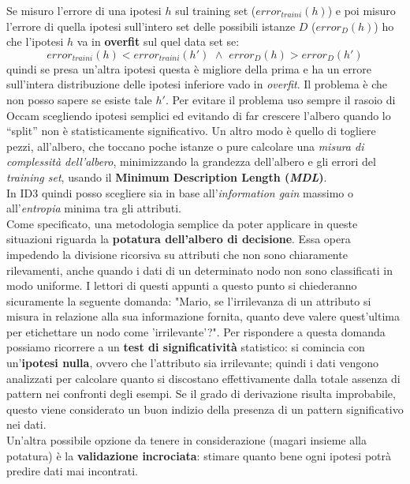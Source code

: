 Se misuro l'errore di una ipotesi
$h$ sul training set ($error_{traini}(h)$) e poi misuro l'errore di quella
ipotesi sull'intero set delle possibili istanze
$D$ ($error_D(h)$) ho che l'ipotesi $h$ va in \textbf{overfit} sul quel data set
se:
\[error_{traini}(h) < error_{traini}(h') \,\,\land
  \,\, error_D(h)>error_D(h')\]
quindi se presa un'altra ipotesi questa è migliore della prima e ha un errore
sull'intera distribuzione delle ipotesi inferiore vado in \textit{overfit}. Il
problema è che non posso sapere se esiste tale $h'$. Per evitare il problema uso
sempre il rasoio di Occam scegliendo ipotesi semplici ed evitando di far
crescere l'albero quando lo ``split'' non è statisticamente significativo. Un
altro modo è quello di togliere pezzi, all'albero, che toccano poche istanze o
pure calcolare una \textit{misura di complessità dell'albero}, minimizzando la
grandezza dell'albero e gli errori del \textit{training set}, usando il
\textbf{Minimum Description Length (\textit{MDL})}.\\
In ID3 quindi posso scegliere sia in base all'\textit{information gain} massimo
o all'\textit{entropia} minima tra gli attributi.\\
Come specificato, una metodologia semplice da poter applicare in queste situazioni riguarda la \textbf{potatura dell'albero di decisione}. Essa opera impedendo la divisione ricorsiva su attributi che non sono chiaramente rilevamenti, anche quando i dati di un determinato nodo non sono classificati in modo uniforme. I lettori di questi appunti a questo punto si chiederanno sicuramente la seguente domanda: "Mario, se l'irrilevanza di un attributo si misura in relazione alla sua informazione fornita, quanto deve valere quest'ultima per etichettare un nodo come 'irrilevante'?". Per rispondere a questa domanda possiamo ricorrere a un \textbf{test di significatività} statistico: si comincia con un'\textbf{ipotesi nulla}, ovvero che l'attributo sia irrilevante; quindi i dati vengono analizzati per calcolare quanto si discostano effettivamente dalla totale assenza di pattern nei confronti degli esempi. Se il grado di derivazione risulta improbabile, questo viene considerato un buon indizio della presenza di un pattern significativo nei dati. \\ Un'altra possibile opzione da tenere in considerazione (magari insieme alla potatura) è la \textbf{validazione incrociata}: stimare quanto bene ogni ipotesi potrà predire dati mai incontrati.
